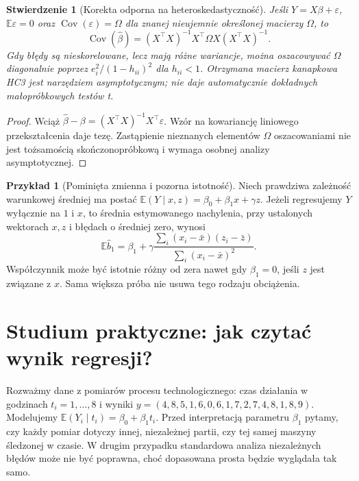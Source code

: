 \documentclass[11pt,a4paper,oneside]{report}
\numberwithin{equation}{chapter}
\theoremstyle{plain}
\newtheorem{stwierdzenie}[twierdzenie]{Stwierdzenie}
\theoremstyle{definition}
\newtheorem{przyklad}{Przykład}[chapter]
\theoremstyle{remark}
\newcommand{\E}{\mathbb E}
\newcommand{\Cov}{\operatorname{Cov}}
\begin{document}
\begin{stwierdzenie}[Korekta odporna na heteroskedastyczność]
\label{prop:hetero-ols}
Jeśli $Y=X\beta+\varepsilon$, $\E\varepsilon=0$ oraz
$\Cov(\varepsilon)=\Omega$ dla znanej nieujemnie
określonej macierzy $\Omega$, to
\[
 \Cov(\widehat\beta)=(X^\top X)^{-1}X^\top
 \Omega X(X^\top X)^{-1}.
\]
Gdy błędy są nieskorelowane, lecz mają różne wariancje,
można \emph{oszacowywać} $\Omega$ diagonalnie poprzez
$e_i^2/(1-h_{ii})^2$ dla $h_{ii}<1$. Otrzymana
macierz kanapkowa HC3 jest narzędziem asymptotycznym;
nie daje automatycznie dokładnych małopróbkowych testów t.
\end{stwierdzenie}
\begin{proof}
Wciąż $\widehat\beta-\beta
=(X^\top X)^{-1}X^\top\varepsilon$.
Wzór na kowariancję liniowego przekształcenia daje tezę.
Zastąpienie nieznanych elementów $\Omega$ oszacowaniami
nie jest tożsamością skończonopróbkową i wymaga osobnej
analizy asymptotycznej.
\end{proof}

\begin{przyklad}[Pominięta zmienna i pozorna istotność]
Niech prawdziwa zależność warunkowej średniej ma postać
$\E(Y\mid x,z)=\beta_0+\beta_1x+\gamma z$.
Jeżeli regresujemy $Y$ wyłącznie na $1$ i $x$,
to średnia estymowanego nachylenia, przy ustalonych
wektorach $x,z$ i błędach o średniej zero, wynosi
\[
 \E\widehat b_1=\beta_1+
 \gamma\frac{\sum_i(x_i-\bar x)(z_i-\bar z)}
                   {\sum_i(x_i-\bar x)^2}.
\]
Współczynnik może być istotnie różny od zera nawet
gdy $\beta_1=0$, jeśli $z$ jest związane z $x$.
Sama większa próba nie usuwa tego rodzaju obciążenia.
\end{przyklad}

\section{Studium praktyczne: jak czytać wynik regresji?}
Rozważmy dane z pomiarów procesu technologicznego:
czas działania w godzinach $t_i=1,\ldots,8$ i wyniki
$y=(4{,}8,5{,}1,6{,}0,6{,}1,7{,}2,7{,}4,8{,}1,8{,}9)$.
Modelujemy $\E(Y_i\mid t_i)=\beta_0+\beta_1t_i$.
Przed interpretacją parametru $\beta_1$ pytamy, czy
każdy pomiar dotyczy innej, niezależnej partii, czy tej
samej maszyny śledzonej w czasie. W drugim przypadku
standardowa analiza niezależnych błędów może nie być
poprawna, choć dopasowana prosta będzie wyglądała tak samo.
\end{document}
